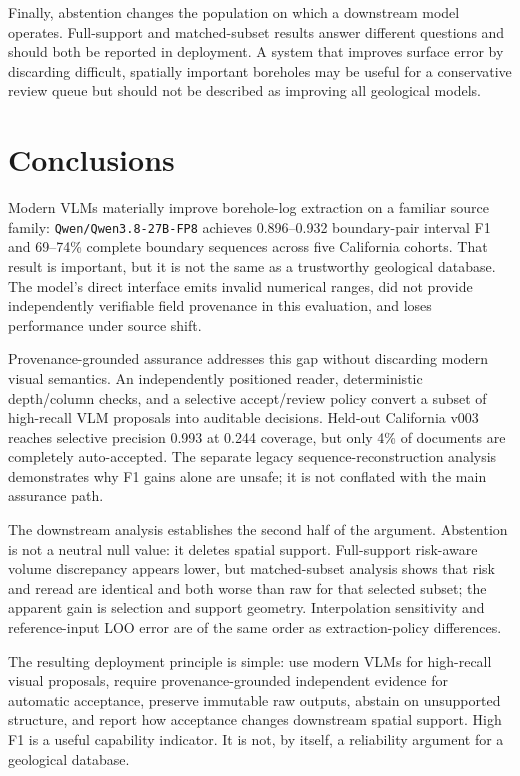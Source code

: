 \documentclass[a4paper,fleqn]{cas-sc}
\begin{document}
Finally, abstention changes the population on which a downstream model operates. Full-support and matched-subset results answer different questions and should both be reported in deployment. A system that improves surface error by discarding difficult, spatially important boreholes may be useful for a conservative review queue but should not be described as improving all geological models.

\section{Conclusions}

Modern VLMs materially improve borehole-log extraction on a familiar source family: \texttt{Qwen/Qwen3.8-27B-FP8} achieves 0.896--0.932 boundary-pair interval F1 and 69--74\% complete boundary sequences across five California cohorts. That result is important, but it is not the same as a trustworthy geological database. The model's direct interface emits invalid numerical ranges, did not provide independently verifiable field provenance in this evaluation, and loses performance under source shift.

Provenance-grounded assurance addresses this gap without discarding modern visual semantics. An independently positioned reader, deterministic depth/column checks, and a selective accept/review policy convert a subset of high-recall VLM proposals into auditable decisions. Held-out California v003 reaches selective precision 0.993 at 0.244 coverage, but only 4\% of documents are completely auto-accepted. The separate legacy sequence-reconstruction analysis demonstrates why F1 gains alone are unsafe; it is not conflated with the main assurance path.

The downstream analysis establishes the second half of the argument. Abstention is not a neutral null value: it deletes spatial support. Full-support risk-aware volume discrepancy appears lower, but matched-subset analysis shows that risk and reread are identical and both worse than raw for that selected subset; the apparent gain is selection and support geometry. Interpolation sensitivity and reference-input LOO error are of the same order as extraction-policy differences.

The resulting deployment principle is simple: use modern VLMs for high-recall visual proposals, require provenance-grounded independent evidence for automatic acceptance, preserve immutable raw outputs, abstain on unsupported structure, and report how acceptance changes downstream spatial support. High F1 is a useful capability indicator. It is not, by itself, a reliability argument for a geological database.
\end{document}
